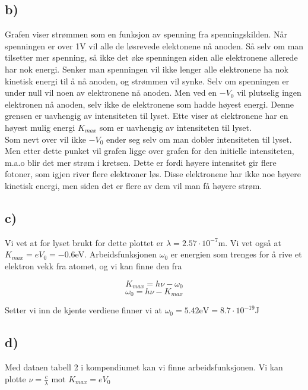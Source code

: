 \documentclass[a4paper,norsk, 10pt]{article}
\begin{document}
\subsection*{b)}
Grafen viser strømmen som en funksjon av spenning fra spenningskilden. Når spenningen er over 1V vil alle de løsrevede elektonene nå anoden. Så selv om man tilsetter mer spenning, så ikke det øke spenningen siden alle elektronene allerede har nok energi. Senker man spenningen vil ikke lenger alle elektronene ha nok kinetisk energi til å nå anoden, og strømmen vil synke. Selv om spenningen er under null vil noen av elektronene nå anoden. Men ved en $-V_0$ vil plutselig ingen elektronen nå anoden, selv ikke de elektronene som hadde høyest energi. Denne grensen er uavhengig av intensiteten til lyset. Ette viser at elektronene har en høyest mulig energi $K_{max}$ som er uavhengig av intensiteten til lyset.\\

Som nevt over vil ikke $-V_0$ ender seg selv om man dobler intensiteten til lyset. Men etter dette punket vil grafen ligge over grafen for den initielle intensiteten, m.a.o blir det mer strøm i kretsen. Dette er fordi høyere intensitet gir flere fotoner, som igjen river flere elektroner løs. Disse elektronene har ikke noe høyere kinetisk energi, men siden det er flere av dem vil man få høyere strøm.

\subsection*{c)}
Vi vet at for lyset brukt for dette plottet er $\lambda = 2.57 \cdot 10^{-7}$m. Vi vet også at $K_{max} = eV_0 = -0.6$eV. Arbeidsfunksjonen $\omega_0$ er energien som trenges for å rive et elektron vekk fra atomet, og vi kan finne den fra 

$$
K_{max} = h\nu - \omega_0
$$
$$
\omega_0 = h\nu - K_{max}
$$

Setter vi inn de kjente verdiene finner vi at $\omega_0 = 5.42 \mathrm{eV} = 8.7 \cdot 10^{-19}$J

\subsection*{d)}
Med dataen tabell 2 i kompendiumet kan vi finne arbeidsfunksjonen. Vi kan plotte $\nu = \frac{c}{\lambda}$ mot $K_{max} = eV_0$ 
\end{document}
